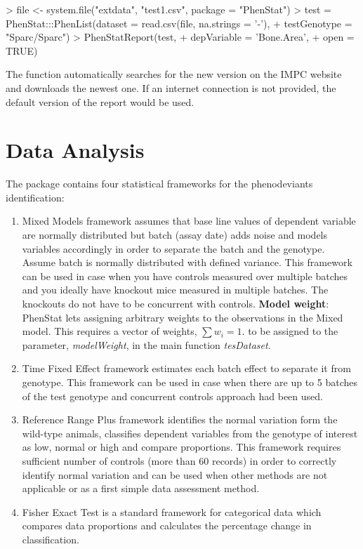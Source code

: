 \documentclass[a4paper]{article}
\begin{document}
\begin{Schunk}
\begin{Sinput}
> file <- system.file("extdata", "test1.csv", package = "PhenStat")
> test = PhenStat:::PhenList(dataset = read.csv(file, na.strings = '-'),
+                            testGenotype = "Sparc/Sparc")
> PhenStatReport(test,
+                depVariable = 'Bone.Area',
+                open = TRUE)
\end{Sinput}
\end{Schunk}
The function automatically searches for the new version on the IMPC website and downloads the newest one. If an internet connection is not provided, the default version of the report would be used.

\section{Data Analysis}
The package contains four statistical frameworks for the phenodeviants identification:
\begin{enumerate}
\item Mixed Models framework assumes that base line values of dependent variable are normally distributed but batch
(assay date) adds noise and models variables accordingly in order to separate the batch and the genotype. Assume
batch is normally distributed with defined variance. This framework can be used in case when you have controls
measured over multiple batches and you ideally have knockout mice measured in multiple batches.
The knockouts do not have to be concurrent with controls.
\subitem \textbf{Model weight}: PhenStat lets assigning arbitrary weights to the observations in the Mixed model. This requires a vector of weights, $\sum w_i=1$. to be assigned to the parameter, \emph{modelWeight}, in the main function \emph{tesDataset}.
\item Time Fixed Effect framework estimates each batch effect to separate it from genotype. This framework can
be used in case when there are up to 5 batches of the test genotype and concurrent controls approach had been used.
\item Reference Range Plus framework identifies the normal variation form the wild-type animals, classifies dependent
variables from the genotype of interest as low, normal or high and compare proportions. This framework requires
sufficient number of controls (more than 60 records) in order to correctly identify normal variation and can be used
when other methods are not applicable or as a first simple data assessment method.
\item Fisher Exact Test is a standard framework for categorical data which compares data proportions and calculates
the percentage change in classification.
\end{enumerate}
\end{document}
